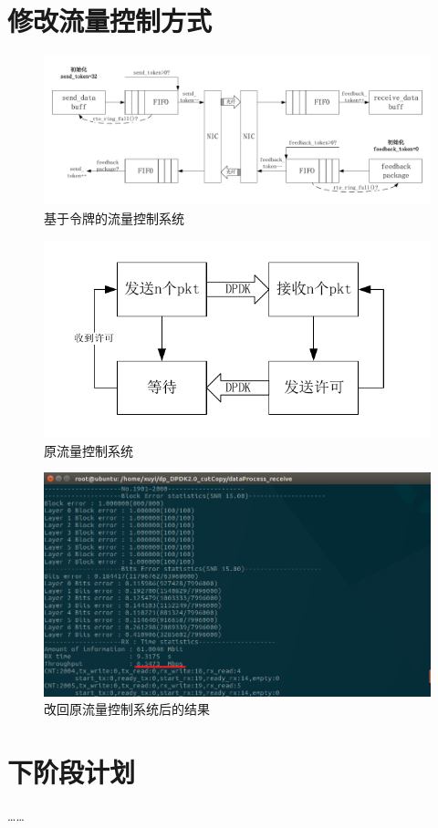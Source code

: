 \documentclass{article}
\begin{document}
\section{修改流量控制方式}
\begin{figure}[H]
	\centering
	\includegraphics[width = \textwidth]{frame_token.pdf}
	\caption{基于令牌的流量控制系统}
\end{figure}
\begin{figure}[H]
	\centering
	\includegraphics[width = .6\textwidth]{flow_traffic.pdf}
	\caption{原流量控制系统}
\end{figure}
\begin{figure}[H]
	\centering
	\includegraphics[width = \textwidth]{result-oldtc.png}
	\caption{改回原流量控制系统后的结果}
\end{figure}



\section{下阶段计划}
……
\end{document}
